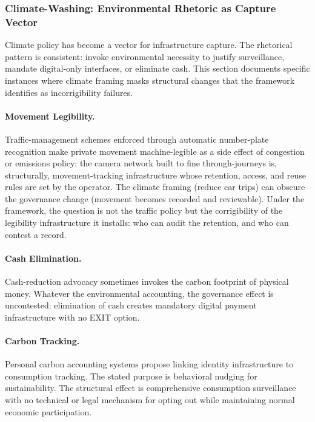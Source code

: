 \documentclass{article}
\begin{document}
\subsubsection{Climate-Washing: Environmental Rhetoric as Capture Vector}
\label{subsubsec:climatewashing}

Climate policy has become a vector for infrastructure capture. The rhetorical pattern is consistent: invoke environmental necessity to justify surveillance, mandate digital-only interfaces, or eliminate cash. This section documents specific instances where climate framing masks structural changes that the framework identifies as incorrigibility failures.

\paragraph{Movement Legibility.} Traffic-management schemes enforced through automatic number-plate recognition make private movement machine-legible as a side effect of congestion or emissions policy: the camera network built to fine through-journeys is, structurally, movement-tracking infrastructure whose retention, access, and reuse rules are set by the operator. The climate framing (reduce car trips) can obscure the governance change (movement becomes recorded and reviewable). Under the framework, the question is not the traffic policy but the corrigibility of the legibility infrastructure it installs: who can audit the retention, and who can contest a record.

\paragraph{Cash Elimination.} Cash-reduction advocacy sometimes invokes the carbon footprint of physical money. Whatever the environmental accounting, the governance effect is uncontested: elimination of cash creates mandatory digital payment infrastructure with no EXIT option.

\paragraph{Carbon Tracking.} Personal carbon accounting systems propose linking identity infrastructure to consumption tracking. The stated purpose is behavioral nudging for sustainability. The structural effect is comprehensive consumption surveillance with no technical or legal mechanism for opting out while maintaining normal economic participation.
\end{document}
